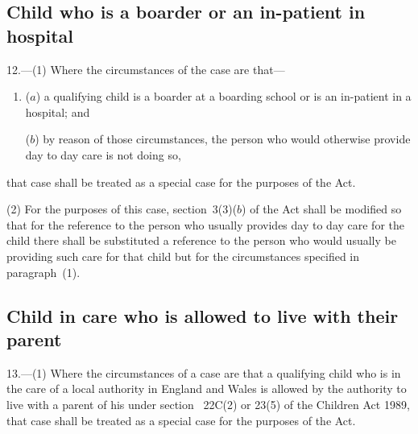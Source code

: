 \documentclass[12pt,a4paper]{article}
\begin{document}

\subsection[12. Child who is a boarder or an in-patient in hospital]{Child who is a boarder or an in-patient in hospital}

12.---(1)  Where the circumstances of the case are that—
\begin{enumerate}\item[]
($a$) a qualifying child is a boarder at a boarding school or is an in-patient in a hospital; and

($b$) by reason of those circumstances, the person who would otherwise provide day to day care is not doing so,
\end{enumerate}
that case shall be treated as a special case for the purposes of the Act.

(2) For the purposes of this case, section~3(3)($b$)  of the Act shall be modified so that for the reference to the person who usually provides day to day care for the child there shall be substituted a reference to the person who would usually be providing such care for that child but for the circumstances specified in paragraph~(1).

\subsection[13. 
Child in care who is allowed to live with their parent  %
]{%
Child in care who is allowed to live with their parent  %
}

13.---(1)  Where the circumstances of a case are that a qualifying child who is in the care of a local authority in England and Wales is allowed by the authority to live with a parent of his under section~%
22C(2) or  %
23(5) of the Children Act 1989, that case shall be treated as a special case for the purposes of the Act.
\end{document}
